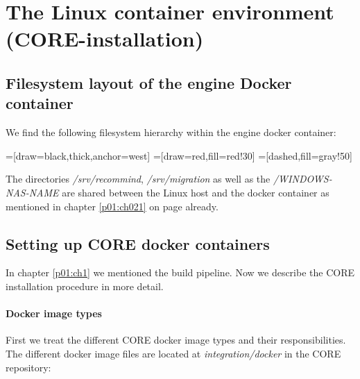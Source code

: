 \chapter{The Linux container environment (CORE-installation)}
	\section{Filesystem layout of the engine Docker container}
	We find the following filesystem hierarchy within the engine docker container:
	
	=[draw=black,thick,anchor=west]
	=[draw=red,fill=red!30]
	=[dashed,fill=gray!50]
	
	The directories \emph{/srv/recommind}, \emph{/srv/migration} as well as the \emph{/WINDOWS-NAS-NAME} are shared between the Linux host and the docker container as mentioned in chapter \ref{p01:ch021} on page \pageref{p01:ch021} already.
	\section{Setting up CORE docker containers}
	In chapter \ref{p01:ch1} we mentioned the build pipeline. Now we describe the CORE installation procedure in more detail.
			\subsubsection{Docker image types}
			First we treat the different CORE docker image types and their responsibilities. The different docker image files are located at \emph{integration/docker} in the CORE repository:
						

